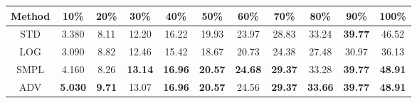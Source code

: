\documentclass{standalone}
\begin{document}
\begin{tabular}{c|cccccccccc}
      \toprule
      Method & 10\% & 20\% & 30\% & 40\% & 50\% & 60\% & 70\% & 80\% & 90\% & 100\% \\
      \midrule
STD & 3.380 & 8.11 & 12.20 & 16.22 & 19.93 & 23.97 & 28.83 & 33.24 & \textbf{39.77} & 46.52\\
LOG & 3.090 & 8.82 & 12.46 & 15.42 & 18.67 & 20.73 & 24.38 & 27.48 & 30.97 & 36.13\\
SMPL & 4.160 & 8.26 & \textbf{13.14} & \textbf{16.96} & \textbf{20.57} & \textbf{24.68} & \textbf{29.37} & 33.28 & \textbf{39.77} & \textbf{48.91}\\
ADV & \textbf{5.030} & \textbf{9.71} & 13.07 & \textbf{16.96} & \textbf{20.57} & 24.56 & \textbf{29.37} & \textbf{33.66} & \textbf{39.77} & \textbf{48.91}\\
  \bottomrule
\end{tabular}
\end{document}
